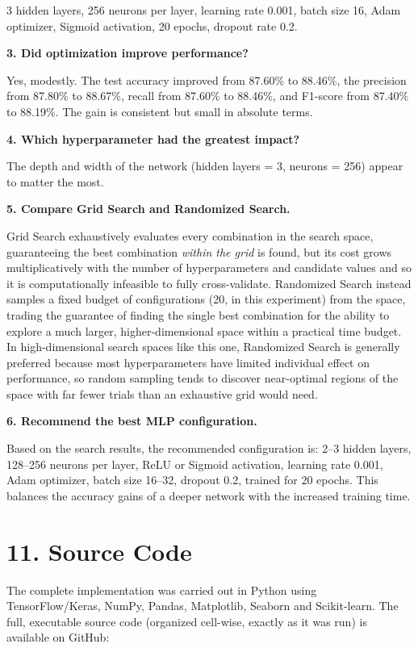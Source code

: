 \documentclass[11pt]{article}
\begin{document}
3 hidden layers, 256 neurons per layer, learning rate 0.001, batch size 16, Adam optimizer, Sigmoid activation, 20 epochs, dropout rate 0.2.

\textbf{3. Did optimization improve performance?}

Yes, modestly. The test accuracy improved from 87.60\% to 88.46\%, the precision from 87.80\% to 88.67\%, recall from 87.60\% to 88.46\%, and F1-score from 87.40\% to 88.19\%. The gain is consistent but small in absolute terms.

\textbf{4. Which hyperparameter had the greatest impact?}

The depth and width of the network (hidden layers = 3, neurons = 256) appear to matter the most.

\textbf{5. Compare Grid Search and Randomized Search.}

Grid Search exhaustively evaluates every combination in the search space, guaranteeing the best combination \emph{within the grid} is found, but its cost grows multiplicatively with the number of hyperparameters and candidate values and so it is computationally infeasible to fully cross-validate. Randomized Search instead samples a fixed budget of configurations (20, in this experiment) from the space, trading the guarantee of finding the single best combination for the ability to explore a much larger, higher-dimensional space within a practical time budget. In high-dimensional search spaces like this one, Randomized Search is generally preferred because most hyperparameters have limited individual effect on performance, so random sampling tends to discover near-optimal regions of the space with far fewer trials than an exhaustive grid would need.

\textbf{6. Recommend the best MLP configuration.}

Based on the search results, the recommended configuration is: 2--3 hidden layers, 128--256 neurons per layer, ReLU or Sigmoid activation, learning rate 0.001, Adam optimizer, batch size 16--32, dropout 0.2, trained for 20 epochs. This balances the accuracy gains of a deeper network with the increased training time.


\section*{11. Source Code}

The complete implementation was carried out in Python using TensorFlow/Keras, NumPy, Pandas, Matplotlib, Seaborn and Scikit-learn. The full, executable source code (organized cell-wise, exactly as it was run) is available on GitHub:
\end{document}
